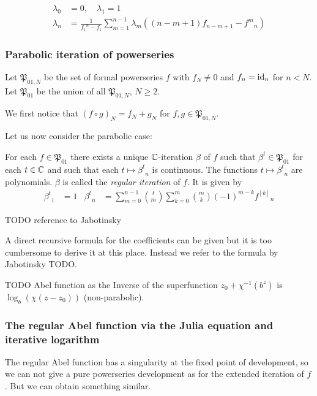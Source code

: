 \documentclass{article}
\numberwithin{equation}{section}
\begin{document}
\begin{align}
  \label{eq:julia_npar}
  \lambda_0&=0,\quad \lambda_1=1\\
  \lambda_n&= \frac{1}{{f_1}^n - f_1} \sum_{m=1}^{n-1} \lambda_m
  \left( (n-m+1)f_{n-m+1}  - {f^m}_n \right)
\end{align}

\subsubsection{Parabolic iteration of powerseries}
\label{sec:Parabolic powerseries}
\newcommand{\psoi}{\mathfrak{P}_{01}}
\newcommand{\psoiN}[1]{\mathfrak{P}_{01,#1}}
\begin{definition}
  Let $\psoiN{N}$ be the set of formal powerseries $f$ with $f_N\neq
  0$ and $f_n = \operatorname{id}_n$ for $n<N$. Let $\psoi$ be the union of all
  $\psoiN{N}$, $N\ge 2$.
\end{definition}
We first notice that $(f\circ g)_N=f_N+g_N$ for $f,g\in\psoiN{N}$.

Let us now consider the parabolic case:
\begin{wellknown}\label{wk:iteration:powerseries:parabolic}
  For each $f\in \psoi$ there exists a unique $\mathbb{C}$-iteration $\beta$ 
  of $f$ such that $\beta^t \in \psoi$ for each $t\in\mathbb{C}$ and such
  that each $t\mapsto {\beta^t}_n$ is continuous. The functions
  $t\mapsto {\beta^t}_n$ are polynomials. $\beta$ is
  called the {\em regular iteration} of $f$. It is given by
  \begin{align}
    \label{eq:parabolic_regular_iteration}
    {\beta^t}_1&=1 & {\beta^t}_n&=\sum_{m=0}^{n-1} \binom{t}{m} \sum_{k=0}^m \binom{m}{k} (-1)^{m-k}
    {f^{[k]}}_{n}
  \end{align}
\end{wellknown}
TODO reference to Jabotinsky

A direct recursive formula for the coefficients can be given but it is
too cumbersome to derive it at this place. Instead we refer to the
formula by Jabotinsky TODO.

TODO
Abel function as the Inverse of the superfunction $z_0+\chi^{-1}(b^z)$ is $\log_b(\chi(z-z_0))$ (non-parabolic).
\subsubsection{The regular Abel function via the Julia equation and iterative logarithm}
The regular Abel function has a singularity at the fixed point of
development, so we can not give a pure powerseries development as  for the extended iteration
of $f$. But we can obtain something similar.
\end{document}

